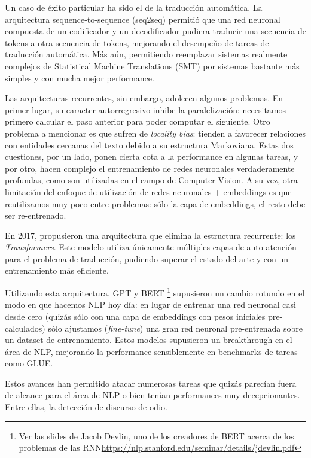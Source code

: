 Un caso de éxito particular ha sido el de la traducción automática. La arquitectura sequence-to-sequence (seq2seq) \cite{sutskever2014sequence} permitió que una red neuronal compuesta de un codificador y un decodificador pudiera traducir una secuencia de tokens a otra secuencia de tokens, mejorando el desempeño de tareas de traducción automática. Más aún, permitiendo reemplazar sistemas realmente complejos de Statistical Machine Translations (SMT) por sistemas bastante más simples y con mucha mejor performance.

Las arquitecturas recurrentes, sin embargo, adolecen algunos problemas. En primer lugar, su caracter autorregresivo inhibe la paralelización: necesitamos primero calcular el paso anterior para poder computar el siguiente. Otro problema a mencionar es que sufren de \emph{locality bias}: tienden a favorecer relaciones con entidades cercanas del texto debido a su estructura Markoviana. Estas dos cuestiones, por un lado, ponen cierta cota a la performance en algunas tareas, y por otro, hacen complejo el entrenamiento de redes neuronales verdaderamente profundas, como son utilizadas en el campo de Computer Vision. A su vez, otra limitación del enfoque de utilización de redes neuronales + embeddings es que reutilizamos muy poco entre problemas: sólo la capa de embeddings, el resto debe ser re-entrenado.

En 2017, \citet{vaswani2017attention} propusieron una arquitectura que elimina la estructura recurrente: los \emph{Transformers}. Este modelo utiliza únicamente múltiples capas de auto-atención para el problema de traducción, pudiendo superar el estado del arte y con un entrenamiento más eficiente.

Utilizando esta arquitectura, GPT y BERT
\footnote{Ver las slides de Jacob Devlin, uno de los creadores de BERT acerca de los problemas de las RNN\url{https://nlp.stanford.edu/seminar/details/jdevlin.pdf}} supusieron un cambio rotundo en el modo en que hacemos NLP hoy día: en lugar de entrenar una red neuronal casi desde cero (quizás sólo con una capa de embeddings con pesos iniciales pre-calculados) sólo ajustamos (\emph{fine-tune}) una gran red neuronal pre-entrenada sobre un dataset de entrenamiento. Estos modelos supusieron un breakthrough en el área de NLP, mejorando la performance sensiblemente en benchmarks de tareas como GLUE.

Estos avances han permitido atacar numerosas tareas que quizás parecían fuera de alcance para el área de NLP o bien tenían performances muy decepcionantes. Entre ellas, la detección de discurso de odio.

